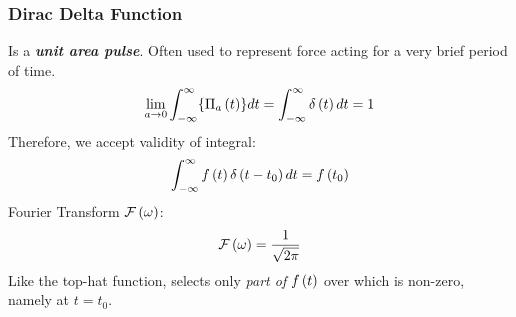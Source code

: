 \subsubsection{Dirac Delta Function}
Is a \textit{\textbf{unit area pulse}}. Often used to represent force acting for a very brief period of time.
\begin{equation}
    \lim\limits_{a \to 0}\int_{-\infty}^{\infty}\{\Pi_a\left(t\right)\}dt=\int_{-\infty}^{\infty}\delta\left(t\right)dt=1
\end{equation}
Therefore, we accept validity of integral:
\begin{equation}
    \int_{-\infty}^{\infty}f\left(t\right)\delta\left(t-t_0\right)dt=f\left(t_0\right)
\end{equation}
Fourier Transform $\mathcal{F}\left(\omega\right)$:
\begin{equation}
    \mathcal{F}\left(\omega\right)=\frac{1}{\sqrt{2\pi}}
\end{equation}
Like the top-hat function, selects only \textit{part of $f\left(t\right)$} over which is non-zero, namely at $t=t_0$.
